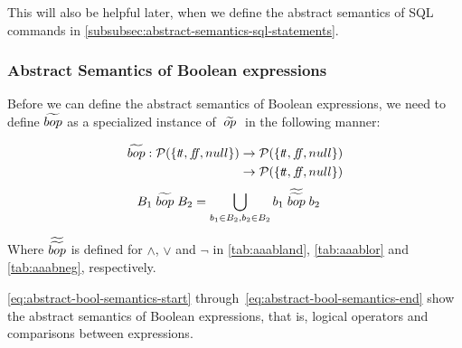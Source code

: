This will also be helpful later, when we define the abstract semantics of SQL commands in \autoref{subsubsec:abstract-semantics-sql-statements}.

\subsubsection{Abstract Semantics of Boolean expressions}
Before we can define the abstract semantics of Boolean expressions, we need to define $\widetilde{bop}$ as a specialized instance of $\;\widetilde{op}\;$ in the following manner:


\begin{align}
    \begin{split}
        \aab{bop} : \mathcal{P}(\{\true, \false, null\}) &\rightarrow \mathcal{P}(\{\true, \false, null\}) \\
        &\rightarrow \mathcal{P}(\{\true, \false, null\})
    \end{split}
\end{align}
\begin{align}
    B_1 \;\widetilde{bop}\; B_2 &= \bigcup_{b_1 \in B_2, b_2 \in B_2} b_1 \;\widetilde{\widetilde{bop}}\; b_2
\end{align}

Where $\widetilde{\widetilde{bop}}$ is defined for $\land$, $\lor$ and $\neg$ in \autoref{tab:aaabland}, \autoref{tab:aaablor} and \autoref{tab:aaabneg}, respectively.

\autoref{eq:abstract-bool-semantics-start} through~\ref{eq:abstract-bool-semantics-end} show the abstract semantics of Boolean expressions, that is, logical operators and comparisons between expressions.


